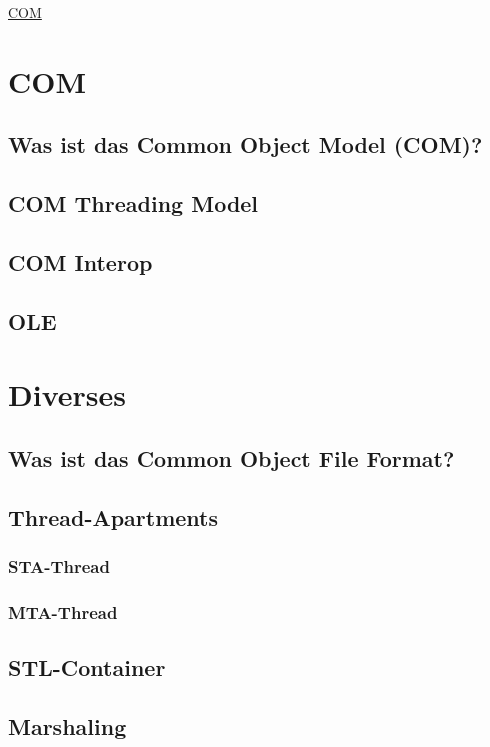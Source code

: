 \raggedright
\footnotesize
\begin{multicols}{3}	
	\setlength{\premulticols}{1pt}
	\setlength{\postmulticols}{1pt}
	\setlength{\multicolsep}{1pt}
	\setlength{\columnsep}{2pt}

\begin{center}
     \Large{\underline{COM}} \\
\end{center}
\section{COM}

\subsection{Was ist das Common Object Model (COM)?}
\lipsum

\subsection{COM Threading Model}
\lipsum

\subsection{COM Interop}
\lipsum

\subsection{OLE}
\lipsum

\section{Diverses}

\subsection{Was ist das Common Object File Format?}
\lipsum

\subsection{Thread-Apartments}

\subsubsection{STA-Thread}
\lipsum

\subsubsection{MTA-Thread}
\lipsum

\subsection{STL-Container}
\lipsum

\subsection{Marshaling}
\lipsum

\end{multicols}